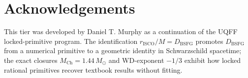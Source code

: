 \documentclass[11pt]{article}
\newcommand{\Dbsfg}{D_{\mathrm{BSFG}}}
\begin{document}
\section*{Acknowledgements}
This tier was developed by Daniel T. Murphy as a continuation of the
UQFF locked-primitive program.  The identification
$r_{\text{ISCO}}/M=\Dbsfg$ promotes $\Dbsfg$ from a numerical
primitive to a geometric identity in Schwarzschild spacetime; the
exact closures $M_{\text{Ch}}=1.44\,M_\odot$ and WD-exponent $-1/3$
exhibit how locked rational primitives recover textbook
results without fitting.
\end{document}
